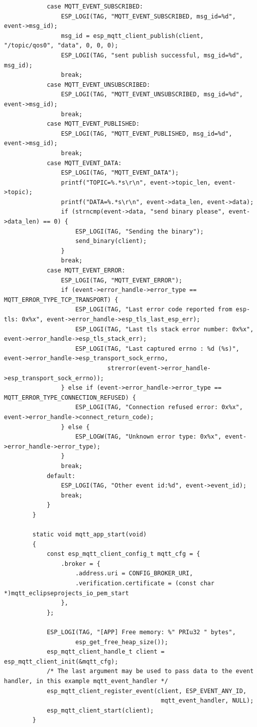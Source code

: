 \documentclass[12pt, a4paper]{article}
\begin{document}
\begin{verbatim}
            case MQTT_EVENT_SUBSCRIBED:
                ESP_LOGI(TAG, "MQTT_EVENT_SUBSCRIBED, msg_id=%d", event->msg_id);
                msg_id = esp_mqtt_client_publish(client, "/topic/qos0", "data", 0, 0, 0);
                ESP_LOGI(TAG, "sent publish successful, msg_id=%d", msg_id);
                break;
            case MQTT_EVENT_UNSUBSCRIBED:
                ESP_LOGI(TAG, "MQTT_EVENT_UNSUBSCRIBED, msg_id=%d", event->msg_id);
                break;
            case MQTT_EVENT_PUBLISHED:
                ESP_LOGI(TAG, "MQTT_EVENT_PUBLISHED, msg_id=%d", event->msg_id);
                break;
            case MQTT_EVENT_DATA:
                ESP_LOGI(TAG, "MQTT_EVENT_DATA");
                printf("TOPIC=%.*s\r\n", event->topic_len, event->topic);
                printf("DATA=%.*s\r\n", event->data_len, event->data);
                if (strncmp(event->data, "send binary please", event->data_len) == 0) {
                    ESP_LOGI(TAG, "Sending the binary");
                    send_binary(client);
                }
                break;
            case MQTT_EVENT_ERROR:
                ESP_LOGI(TAG, "MQTT_EVENT_ERROR");
                if (event->error_handle->error_type == MQTT_ERROR_TYPE_TCP_TRANSPORT) {
                    ESP_LOGI(TAG, "Last error code reported from esp-tls: 0x%x", event->error_handle->esp_tls_last_esp_err);
                    ESP_LOGI(TAG, "Last tls stack error number: 0x%x", event->error_handle->esp_tls_stack_err);
                    ESP_LOGI(TAG, "Last captured errno : %d (%s)",  event->error_handle->esp_transport_sock_errno,
                             strerror(event->error_handle->esp_transport_sock_errno));
                } else if (event->error_handle->error_type == MQTT_ERROR_TYPE_CONNECTION_REFUSED) {
                    ESP_LOGI(TAG, "Connection refused error: 0x%x", event->error_handle->connect_return_code);
                } else {
                    ESP_LOGW(TAG, "Unknown error type: 0x%x", event->error_handle->error_type);
                }
                break;
            default:
                ESP_LOGI(TAG, "Other event id:%d", event->event_id);
                break;
            }
        }
        
        static void mqtt_app_start(void)
        {
            const esp_mqtt_client_config_t mqtt_cfg = {
                .broker = {
                    .address.uri = CONFIG_BROKER_URI,
                    .verification.certificate = (const char *)mqtt_eclipseprojects_io_pem_start
                },
            };
        
            ESP_LOGI(TAG, "[APP] Free memory: %" PRIu32 " bytes", 
                    esp_get_free_heap_size());
            esp_mqtt_client_handle_t client = esp_mqtt_client_init(&mqtt_cfg);
            /* The last argument may be used to pass data to the event handler, in this example mqtt_event_handler */
            esp_mqtt_client_register_event(client, ESP_EVENT_ANY_ID, 
                                            mqtt_event_handler, NULL);
            esp_mqtt_client_start(client);
        }
    \end{verbatim}
\end{document}
